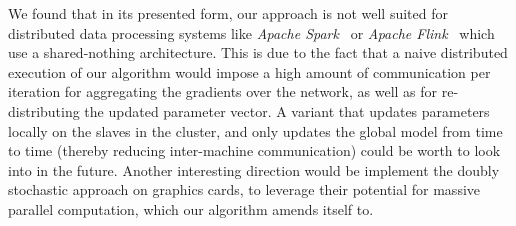 \documentclass{article} %
\begin{document}
We found that in its presented form, our approach is not well suited for distributed data processing systems like \textit{Apache Spark}~\cite{Zaharia2012} or \textit{Apache Flink}~\cite{Alexandrov2014} which use a shared-nothing architecture. This is due to the fact that a naive distributed execution of our algorithm would impose a high amount of communication per iteration for aggregating the gradients over the network, as well as for re-distributing the updated parameter vector. A variant that updates parameters locally on the slaves in the cluster, and only updates the global model from time to time (thereby reducing inter-machine communication) could be worth to look into in the future. Another interesting direction would be implement the doubly stochastic approach on graphics cards, to leverage their potential for massive parallel computation, which our algorithm amends itself to.

\newpage

{\small
  
  }
\end{document}
